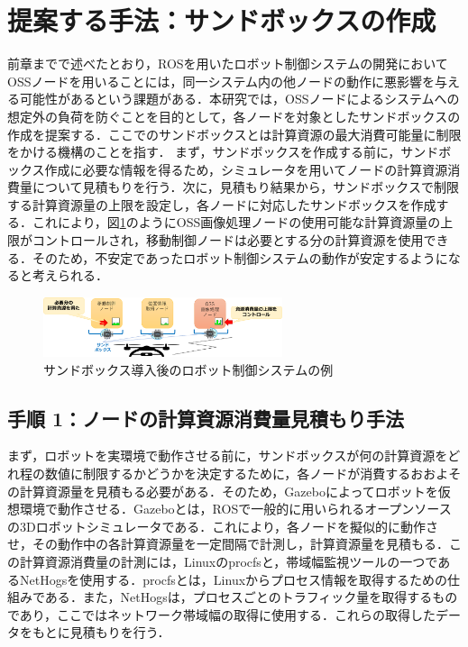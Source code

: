 \documentclass[11pt]{ujarticle} %
\begin{document}
\section{提案する手法：サンドボックスの作成}
前章までで述べたとおり，ROSを用いたロボット制御システムの開発においてOSSノードを用いることには，同一システム内の他ノードの動作に悪影響を与える可能性があるという課題がある．本研究では，OSSノードによるシステムへの想定外の負荷を防ぐことを目的として，各ノードを対象としたサンドボックスの作成を提案する．ここでのサンドボックスとは計算資源の最大消費可能量に制限をかける機構のことを指す．
まず，サンドボックスを作成する前に，サンドボックス作成に必要な情報を得るため，シミュレータを用いてノードの計算資源消費量について見積もりを行う．次に，見積もり結果から，サンドボックスで制限する計算資源量の上限を設定し，各ノードに対応したサンドボックスを作成する．これにより，図\ref{fig:after}のようにOSS画像処理ノードの使用可能な計算資源量の上限がコントロールされ，移動制御ノードは必要とする分の計算資源を使用できる．そのため，不安定であったロボット制御システムの動作が安定するようになると考えられる．

\begin{figure}[h]
   \centering
   \includegraphics[width=7cm]{img/after.pdf}
   \caption{サンドボックス導入後のロボット制御システムの例}
   \label{fig:after}
\end{figure}

\subsection{手順 1：ノードの計算資源消費量見積もり手法}
まず，ロボットを実環境で動作させる前に，サンドボックスが何の計算資源をどれ程の数値に制限するかどうかを決定するために，各ノードが消費するおおよその計算資源量を見積もる必要がある．そのため，Gazebo\cite{Gazebo}によってロボットを仮想環境で動作させる．Gazeboとは，ROSで一般的に用いられるオープンソースの3Dロボットシミュレータである．これにより，各ノードを擬似的に動作させ，その動作中の各計算資源量を一定間隔で計測し，計算資源量を見積もる．この計算資源消費量の計測には，Linuxのprocfsと，帯域幅監視ツールの一つであるNetHogsを使用する．procfsとは，Linuxからプロセス情報を取得するための仕組みである\cite{procMan}．また，NetHogsは，プロセスごとのトラフィック量を取得するものであり，ここではネットワーク帯域幅の取得に使用する．これらの取得したデータをもとに見積もりを行う．
\end{document}
